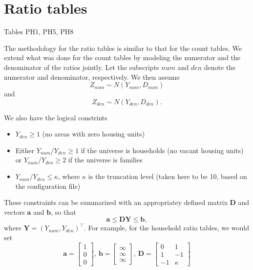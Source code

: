 \documentclass{article}
\begin{document}




\section{Ratio tables}

Tables PH1, PH5, PH8

The methodology for the ratio tables is similar to that for the count tables.
We extend what was done for the count tables by modeling the numerator and
the denominator of the ratios jointly.  Let the subscripts \(num\) and \(den\)
denote the numerator and denominator, respectively.  We then assume
\begin{equation*}
  Z_{num} \sim N \left( Y_{num}, D_{num} \right)
\end{equation*}
and
\begin{equation*}
  Z_{den} \sim N \left( Y_{den}, D_{den} \right).
\end{equation*}

We also have the logical constrints
\begin{itemize}
  \item \(Y_{den} \geq 1\) (no areas with zero housing units)
  \item Either \(Y_{num} / Y_{den} \geq 1\) if the universe is households (no
    vacant housing units) or \(Y_{num} / Y_{den} \geq 2\) if the universe is
    families
  \item \(Y_{num} / Y_{den} \leq \kappa\), where \(\kappa\) is the truncation
    level (taken here to be 10, based on the configuration file)
\end{itemize}
These constraints can be summarized with an appropriatey defined matrix
\(\boldsymbol{D}\) and vectors \(\boldsymbol{a}\) and \(\boldsymbol{b}\), so
that
\begin{equation*}
  \boldsymbol{a} \leq \boldsymbol{D} \boldsymbol{Y} \leq \boldsymbol{b},
\end{equation*}
where \(\boldsymbol{Y} = \left( Y_{num}, Y_{den} \right)^\intercal\).  For
example, for the household ratio tables, we would set
\begin{equation*}
  \boldsymbol{a} = \begin{bmatrix} 1 \\ 0 \\ 0 \end{bmatrix}, \
  \boldsymbol{b} = \begin{bmatrix} \infty \\ \infty \\ \infty \end{bmatrix}, \
  \boldsymbol{D} = \begin{bmatrix} 0 & 1 \\ 1 & -1 \\ -1 & \kappa \end{bmatrix}
\end{equation*}
\end{document}
